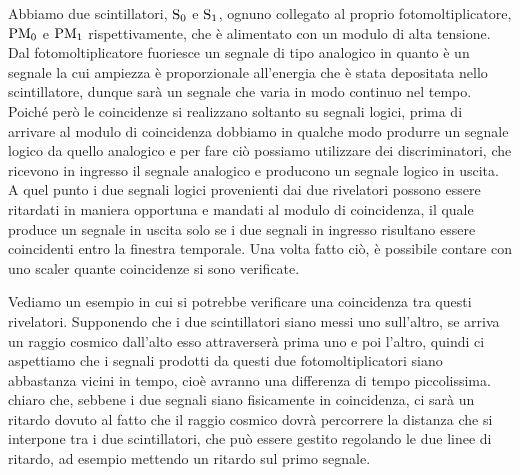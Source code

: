 \vspace{-0.35cm}Abbiamo due scintillatori, $\rm S_0$ e $\rm S_1$, ognuno collegato al proprio fotomoltiplicatore, $\rm PM_0$ e $\rm PM_1$ rispettivamente, che è alimentato con un modulo di alta tensione. Dal fotomoltiplicatore fuoriesce un segnale di tipo analogico in quanto è un segnale la cui ampiezza è proporzionale all'energia che è stata depositata nello scintillatore, dunque sarà un segnale che varia in modo continuo nel tempo. Poiché però le coincidenze si realizzano soltanto su segnali logici, prima di arrivare al modulo di coincidenza dobbiamo in qualche modo produrre un segnale logico da quello analogico e per fare ciò possiamo utilizzare dei discriminatori, che ricevono in ingresso il segnale analogico e producono un segnale logico in uscita. A quel punto i due segnali logici provenienti dai due rivelatori possono essere ritardati in maniera opportuna e mandati al modulo di coincidenza, il quale produce un segnale in uscita solo se i due segnali in ingresso risultano essere coincidenti entro la finestra temporale. Una volta fatto ciò, è possibile contare con uno scaler quante coincidenze si sono verificate.

Vediamo un esempio in cui si potrebbe verificare una coincidenza tra questi rivelatori. Supponendo che i due scintillatori siano messi uno sull'altro, se arriva un raggio cosmico dall'alto esso attraverserà prima uno e poi l'altro, quindi ci aspettiamo che i segnali prodotti da questi due fotomoltiplicatori siano abbastanza vicini in tempo, cioè avranno una differenza di tempo piccolissima. \E chiaro che, sebbene i due segnali siano fisicamente in coincidenza, ci sarà un ritardo dovuto al fatto che il raggio cosmico dovrà percorrere la distanza che si interpone tra i due scintillatori, che può essere gestito regolando le due linee di ritardo, ad esempio mettendo un ritardo sul primo segnale.


